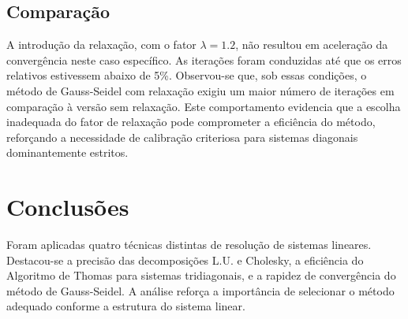 \documentclass[12pt]{article}
\begin{document}
\subsection{Comparação}

A introdução da relaxação, com o fator \(\lambda=1.2\), não resultou em aceleração da convergência neste caso específico. As iterações foram conduzidas até que os erros relativos estivessem abaixo de 5\%. Observou-se que, sob essas condições, o método de Gauss-Seidel com relaxação exigiu um maior número de iterações em comparação à versão sem relaxação. Este comportamento evidencia que a escolha inadequada do fator de relaxação pode comprometer a eficiência do método, reforçando a necessidade de calibração criteriosa para sistemas diagonais dominantemente estritos.

\section{Conclusões}

Foram aplicadas quatro técnicas distintas de resolução de sistemas lineares. Destacou-se a precisão das decomposições L.U. e Cholesky, a eficiência do Algoritmo de Thomas para sistemas tridiagonais, e a rapidez de convergência do método de Gauss-Seidel. A análise reforça a importância de selecionar o método adequado conforme a estrutura do sistema linear.
\end{document}
